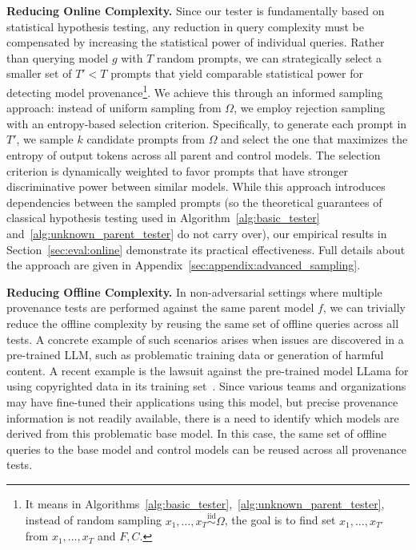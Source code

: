 \vspace{10pt}
\noindent
\textbf{Reducing Online Complexity.}
Since our tester is fundamentally based on statistical hypothesis testing, any reduction in query complexity must be compensated by increasing the statistical power of individual queries. Rather than querying model $g$ with $T$ random prompts, we can strategically select a smaller set of $T'<T$ prompts that yield comparable statistical power for detecting model provenance\footnote{It means in  Algorithms~\ref{alg:basic_tester},~\ref{alg:unknown_parent_tester}, instead of random sampling $x_1,\ldots,x_T \stackrel{\text{iid}}{\sim} \Omega$, the goal is to find set $x_1,\ldots,x_{T'}$  from $x_1,\ldots,x_T$ and $F,C$.}. We achieve this through an informed sampling approach: instead of uniform sampling from $\Omega$, we employ rejection sampling with an entropy-based selection criterion. Specifically, to generate each prompt in $T'$, we sample $k$ candidate prompts from $\Omega$ and select the one that maximizes the entropy of output tokens across all parent and control models. The selection criterion is dynamically weighted to favor prompts that have stronger discriminative power between similar models. While this approach introduces dependencies between the sampled  prompts (so the theoretical guarantees of classical hypothesis testing used in Algorithm~\ref{alg:basic_tester} and~\ref{alg:unknown_parent_tester} do not carry over), our empirical results in Section~\ref{sec:eval:online} demonstrate its practical effectiveness.
Full details about the approach are given in Appendix~\ref{sec:appendix:advanced_sampling}.

\vspace{10pt}
\noindent
\textbf{Reducing Offline Complexity.}
In non-adversarial settings where multiple provenance tests are performed against the same parent model $f$, we can trivially reduce the offline complexity by reusing the same set of offline queries across all tests. 
A concrete example of such scenarios arises when issues are discovered in a pre-trained LLM, such as problematic training data or generation of harmful content. A recent example is the lawsuit against the pre-trained model LLama for using copyrighted data in its training set~\cite{Reuters2024Meta}.  Since various teams and organizations may have fine-tuned their applications using this model, but precise provenance information is not readily available, there is a need to identify which models are derived from this problematic base model. In this case, the same set of offline queries to the base model and control models can be reused across all provenance tests.

